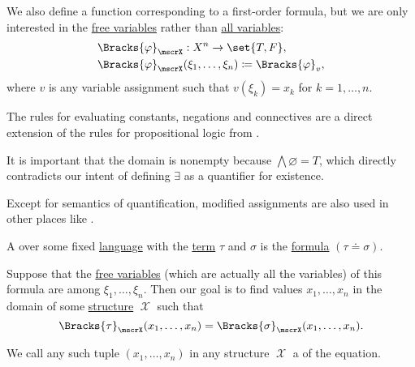 \begin{definition}
\begin{thmenum}
     We also define a function corresponding to a first-order formula, but we are only interested in the \hyperref[def:first_order_syntax/formula_free_variables]{free variables} rather than \hyperref[def:first_order_syntax/formula_variables]{all variables}:
    \begin{equation*}
      \begin{aligned}
        &\Bracks{\varphi}_\mscrX: X^n \to \set{ T, F }, \\
        &\Bracks{\varphi}_\mscrX(\xi_1, \ldots, \xi_n) \coloneqq \Bracks{\varphi}_v,
      \end{aligned}
    \end{equation*}
    where \( v \) is any variable assignment such that \( v(\xi_k) = x_k \) for \( k = 1, \ldots, n \).
  \end{thmenum}
\end{definition}
\begin{comments}
  \item The rules for evaluating constants, negations and connectives are a direct extension of the rules for propositional logic from .

  \item It is important that the domain is nonempty because \( \bigwedge\varnothing = T \), which directly contradicts our intent of defining \( \exists \) as a quantifier for existence.

  \item Except for semantics of quantification, modified assignments are also used in other places like .
\end{comments}

\begin{definition}\label{def:first_order_equation}\mimprovised
  A  over some fixed \hyperref[def:first_order_language]{language} with  the \hyperref[def:first_order_syntax/term]{term} \( \tau \) and  \( \sigma \) is the \hyperref[def:first_order_syntax/formula]{formula} \( (\tau \doteq \sigma) \).

  Suppose that the \hyperref[def:first_order_syntax/formula_free_variables]{free variables} (which are actually all the variables) of this formula are among \( \xi_1, \ldots, \xi_n \). Then our goal is to find values \( x_1, \ldots, x_n \) in the domain of some \hyperref[def:first_order_structure]{structure} \( \mscrX \) such that
  \begin{equation*}
    \Bracks{\tau}_\mscrX(x_1, \ldots, x_n) = \Bracks{\sigma}_\mscrX(x_1, \ldots, x_n).
  \end{equation*}

  We call any such tuple \( (x_1, \ldots, x_n) \) in any structure \( \mscrX \) a  of the equation.
\end{definition}

